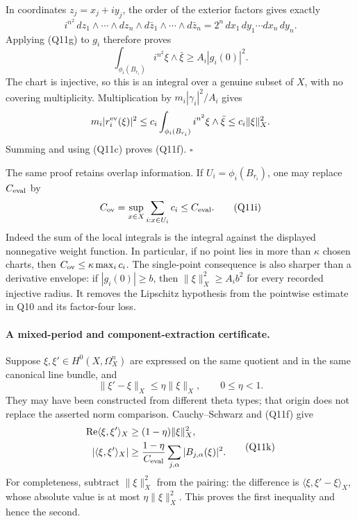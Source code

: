 In coordinates $z_j=x_j+iy_j$, the order of the exterior
factors gives exactly
\[
 i^{n^2}\,dz_1\wedge\cdots\wedge dz_n\wedge
        d\bar z_1\wedge\cdots\wedge d\bar z_n
        =2^n\,dx_1\,dy_1\cdots dx_n\,dy_n.
\]
Applying (Q11g) to $g_i$ therefore proves
\[
 \int_{\phi_i(B_{r_i})}i^{n^2}\xi\wedge\bar\xi
          \geq A_i |g_i(0)|^2.
 \tag{Q11h}
\]
The chart is injective, so this is an integral over a genuine
subset of $X$, with no covering multiplicity.  Multiplication
by $m_i|\gamma_i|^2/A_i$ gives
\[
 m_i|r_i^{\rm ev}(\xi)|^2
       \leq c_i\int_{\phi_i(B_{r_i})}i^{n^2}\xi\wedge\bar\xi
       \leq c_i\|\xi\|_X^2.
\]
Summing and using (Q11c) proves (Q11f).
\hfill$\square$

The same proof retains overlap information.  If
$U_i=\phi_i(B_{r_i})$, one may replace $C_{\rm eval}$ by
\[
 C_{\rm ov}=\sup_{x\in X}\sum_{i:x\in U_i}c_i
         \leq C_{\rm eval}.
 \tag{Q11i}
\]
Indeed the sum of the local integrals is the integral against
the displayed nonnegative weight function.  In particular,
if no point lies in more than $\kappa$ chosen charts, then
$C_{\rm ov}\leq\kappa\max_i c_i$.
The single-point consequence is also sharper than a derivative
envelope: if $|g_i(0)|\geq b$, then
$\|\xi\|_X^2\geq A_i b^2$ for every recorded injective radius.
It removes the Lipschitz hypothesis from the pointwise estimate
in Q10 and its factor-four loss.

\paragraph{A mixed-period and component-extraction certificate.}
Suppose $\xi,\xi'\in H^0(X,\Omega_X^n)$ are expressed on the
same quotient and in the same canonical line bundle, and
\[
       \|\xi'-\xi\|_X\leq\eta\|\xi\|_X,
       \qquad 0\leq\eta<1.
 \tag{Q11j}
\]
They may have been constructed from different theta types;
that origin does not replace the asserted norm comparison.
Cauchy--Schwarz and (Q11f) give
\[
 \begin{split}
 \operatorname{Re}\langle\xi,\xi'\rangle_X
      &\geq(1-\eta)\|\xi\|_X^2,\\
 |\langle\xi,\xi'\rangle_X|
      &\geq\frac{1-\eta}{C_{\rm eval}}
                    \sum_{j,\alpha}|B_{j,\alpha}(\xi)|^2.
 \end{split}
 \tag{Q11k}
\]
For completeness, subtract $\|\xi\|_X^2$ from the pairing:
the difference is $\langle\xi,\xi'-\xi\rangle_X$, whose
absolute value is at most $\eta\|\xi\|_X^2$.  This proves
the first inequality and hence the second.

